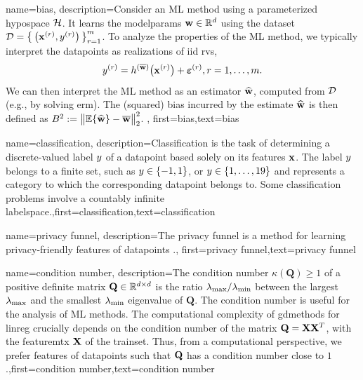 {
	name={bias},
	description={Consider an ML method using a parameterized \gls{hypospace} $\mathcal{H}$. 
		It learns the \gls{modelparams} ${\bf w} \in \mathbb{R}^{d}$ using the \gls{dataset} $\mathcal{D}=\big\{ \left( {\bf x}^{(r)},y^{(r)} \right) \big\}_{r=1}^{m}$. 
		To analyze the properties of the ML method, we typically interpret the \gls{datapoint}s as \gls{realization}s 
		of \gls{iid} \gls{rv}s, $$ y^{(r)} = h^{(\overline{{\bf w}})}\big( {\bf x}^{(r)} \big) + \bm{\varepsilon}^{(r)}, r=1,\ldots,m.$$ 
		We can then interpret the ML method as an estimator $\widehat{{\bf w}}$, 
		computed from $\mathcal{D}$ (e.g., by solving \gls{erm}). The (squared) bias incurred by the estimate $\widehat{{\bf w}}$ 
		is then defined as $B^{2} := \big\| \mathbb{E} \{ \widehat{{\bf w}}  \}- \overline{{\bf w}}\big\|_{2}^{2}$. },
first={bias},text={bias} 
}

{name={classification},
 description={Classification is the task of determining a 
		discrete-valued label $y$ of a \gls{datapoint} based solely on its 
		features ${\bf x}$. The label $y$ belongs to a finite set, such 
		as $y \in \{ -1,1\}$, or $y \in \{1,\ldots,19\}$ and represents a 
		category to which the corresponding \gls{datapoint} belongs to. Some classification 
		problems involve a countably infinite \gls{labelspace}.},first={classification},text={classification} 
}


{name={privacy funnel},
 description={The privacy funnel is a method for learning privacy-friendly \gls{feature}s 
	of \gls{datapoint}s \cite{PrivacyFunnel}.},
 first={privacy funnel},text={privacy funnel} 
}




{
	name={condition number},
	description={The condition number $\kappa(\mathbf{Q}) \geq 1$ of a 
		positive definite 
		matrix $\mathbf{Q} \in \mathbb{R}^{d \times d}$ is the ratio 
		$\lambda_{\rm max} /\lambda_{\rm min}  $ between the 
		largest $\lambda_{\rm max}$ and the smallest $\lambda_{\rm min}$ \gls{eigenvalue} of 
		$\mathbf{Q}$. The condition number is useful for the analysis of ML methods. 
		The computational complexity of \gls{gdmethods} for \gls{linreg} crucially depends on the 
		condition number of the matrix $\mathbf{Q} = {\bf X} {\bf X}^{T}$, with the \gls{featuremtx} ${\bf X}$ 
		of the \gls{trainset}. Thus, from a computational perspective, we prefer \gls{feature}s of 
		\gls{datapoint}s such that $\mathbf{Q}$ has a condition number close to $1$.},first={condition number},text={condition number} 
}

